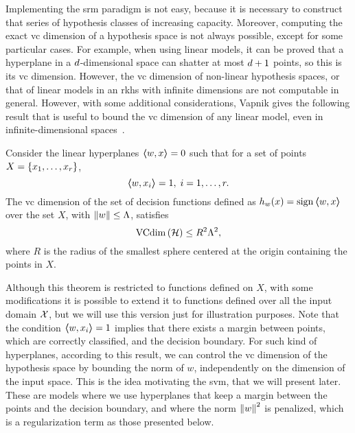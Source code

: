 Implementing the \acrshort{srm} paradigm is not easy, because it is necessary to construct that series of hypothesis classes of increasing capacity. Moreover, computing the exact \acrshort{vc} dimension of a hypothesis space is not always possible, except for some particular cases.
%
For example, when using linear models, it can be proved that a hyperplane in a $d$-dimensional space can shatter at most $d+1$ points, so this is its \acrshort{vc} dimension.
%
However, the \acrshort{vc} dimension of non-linear hypothesis spaces, or that of linear models in an \acrshort{rkhs} with infinite dimensions are not computable in general.
%
However, with some additional considerations, Vapnik gives the following result that is useful to bound the \acrshort{vc} dimension of any linear model, even in infinite-dimensional spaces~\citep{vapnik1982estimation}.
\begin{theorem}
    Consider the linear hyperplanes $\bm{\left\langle} w, x \bm{\right\rangle} = 0$ such that for a set of points $X = \left\{x_1, \ldots, x_r\right\}$,
    \begin{equation}
        \nonumber
        \bm{\left\langle} w, x_i \bm{\right\rangle} = 1 , \; i=1, \ldots, r.
    \end{equation} 
    The \acrshort{vc} dimension of the set of decision functions defined as $h_w(x) = \operatorname{sign} \bm{\left\langle} w, x \bm{\right\rangle}$ over the set $X$, with $\left\lVert w\right\rVert \leq \Lambda$, satisfies
    \begin{equation}
        \nonumber
        \operatorname{VCdim}\left(\mathcal{H}\right) \leq R^2 \Lambda^2 ,
    \end{equation}
    where $R$ is the radius of the smallest sphere centered at the origin containing the points in $X$.
\end{theorem}
Although this theorem is restricted to functions defined on $X$, with some modifications it is possible to extend it to functions defined over all the input domain $\mathcal{X}$, but we will use this version just for illustration purposes.
%
Note that the condition $\bm{\left\langle} w, x_i \bm{\right\rangle} = 1$ implies that there exists a margin between points, which are correctly classified, and the decision boundary.
%
For such kind of hyperplanes, according to this result, we can control the \acrshort{vc} dimension of the hypothesis space by bounding the norm of $w$, independently on the dimension of the input space.
%
This is the idea motivating the \acrshort{svm}, that we will present later. These are models where we use hyperplanes that keep a margin between the points and the decision boundary, and where the norm $\left\lVert w\right\rVert^2$ is penalized, which is a regularization term as those presented below.





